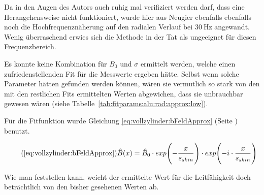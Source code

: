 {	\begin{minipage}[t]{0.33\textwidth}
        \vspace{0mm}
        Da in  den Augen des  Autors auch  ruhig mal verifiziert  werden darf,
        dass eine Herangehensweise nicht  funktioniert, wurde hier aus Neugier
        ebenfalls ebenfalls  noch die Hochfrequenzn\"aherung auf  den radialen
        Verlauf   bei  $\SI{30}{\hertz}$   angewandt.   Wenig   \"uberraschend
        erwies  sich  die Methode  in  der  Tat  als ungeeignet  f\"ur  diesen
        Frequenzbereich.

        Es  konnte  keine  Kombination  f\"ur  $B_0$  und  $\sigma$  ermittelt
        werden,  welche  einen  zufriedenstellenden Fit  f\"ur  die  Messwerte
        ergeben h\"atte. Selbst wenn solche Parameter h\"atten gefunden werden
        k\"onnen, w\"aren sie  vermutlich so stark von den  mit den restlichen
        Fits  ermittelten  Werten  abgewichen, dass  sie  unbrauchbar  gewesen
        w\"aren (siehe Tabelle~\ref{tab:fitparams:alu:rad:approx:low}).

        F\"ur               die                Fitfunktion               wurde
        Gleichung           \ref{eq:vollzylinder:bFeldApprox}           (Seite
        \pageref{eq:vollzylinder:bFeldApprox}) benutzt.

        \begin{equation}
            \tag{\ref{eq:vollzylinder:bFeldApprox}}
            \hat{B} (x) = \hat{B}_0 \cdot exp\Biggl(-\frac{x}{s_{skin}} \Biggr) \cdot exp\Biggl(-i \cdot \frac{x}{s_{skin}} \Biggr)
        \end{equation}

        

        \vspace{0.5em}

        Wie  man  feststellen  kann,  weicht der  ermittelte  Wert  f\"ur  die
        Leitf\"ahigkeit doch  betr\"achtlich von  den bisher  gesehenen Werten
        ab.
	\end{minipage}%
	\begin{minipage}[t]{0.67\textwidth}
        \vspace{0mm}
        \hfill
        \resizebox{.95\textwidth}{!}{}
        \label{fig:alu:rad:approx:low}
	\end{minipage}


}
